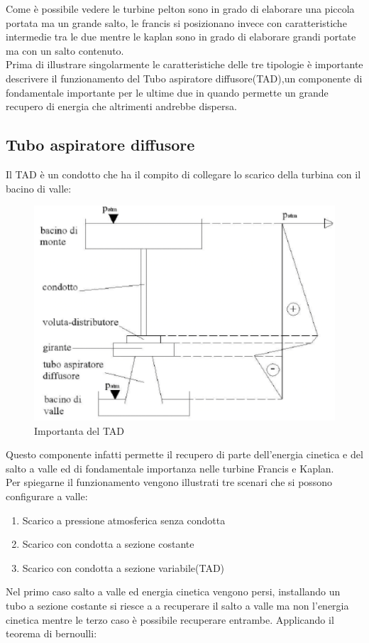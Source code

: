 Come è possibile vedere le turbine pelton sono in grado di elaborare una piccola portata ma un grande salto, le francis si posizionano invece con caratteristiche intermedie tra le due mentre le kaplan sono in grado di elaborare grandi portate ma con un salto contenuto.\\
Prima di illustrare singolarmente le caratteristiche delle tre tipologie è importante descrivere il funzionamento del Tubo aspiratore diffusore(TAD),un componente di fondamentale importante per le ultime due in quando permette un grande recupero di energia che altrimenti andrebbe dispersa.
\subsection{Tubo aspiratore diffusore}
Il TAD è un condotto che ha il compito di collegare lo scarico della turbina con il bacino di valle:
\begin{figure}[H]
    \centering
    \includegraphics[height=0.4\textwidth]{res/cap 3/francis con TAD}
    \caption{Importanta del TAD}
\end{figure}\noindent
Questo componente infatti permette il recupero di parte dell'energia cinetica e del salto a valle ed di fondamentale importanza nelle turbine Francis e Kaplan.\\
Per spiegarne il funzionamento vengono illustrati tre scenari che si possono configurare a valle:
\begin{enumerate}
    \item Scarico a pressione atmosferica senza condotta
    \item Scarico con condotta a sezione costante
    \item Scarico con condotta a sezione variabile(TAD)
\end{enumerate}
Nel primo caso salto a valle ed energia cinetica vengono persi, installando un tubo a sezione costante si riesce a a recuperare il salto a valle ma non l'energia cinetica mentre le terzo caso è possibile recuperare entrambe.
Applicando il teorema di bernoulli:

